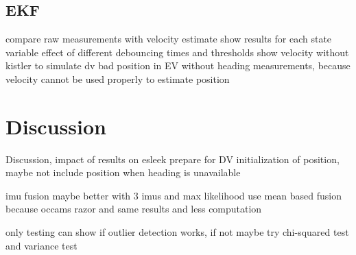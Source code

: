 \subsection{EKF}


compare raw measurements with velocity estimate
show results for each state variable
effect of different debouncing times and thresholds
show velocity without kistler to simulate dv
bad position in EV without heading measurements, because velocity cannot be used properly to estimate position






\section{Discussion}
Discussion, impact of results on esleek
prepare for DV
initialization of position, maybe not include position when heading is unavailable

imu fusion maybe better with 3 imus and max likelihood
use mean based fusion because occams razor and same results and less computation

only testing can show if outlier detection works, if not maybe try chi-squared test and variance test



